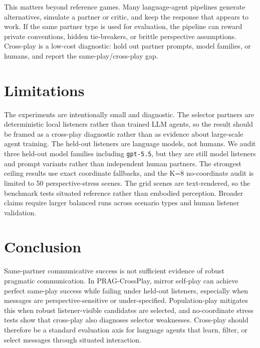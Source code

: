 \documentclass{article}
\begin{document}
This matters beyond reference games. Many language-agent pipelines generate alternatives, simulate a partner or critic, and keep the response that appears to work. If the same partner type is used for evaluation, the pipeline can reward private conventions, hidden tie-breakers, or brittle perspective assumptions. Cross-play is a low-cost diagnostic: hold out partner prompts, model families, or humans, and report the same-play/cross-play gap.

\section{Limitations}

The experiments are intentionally small and diagnostic. The selector partners are deterministic local listeners rather than trained LLM agents, so the result should be framed as a cross-play diagnostic rather than as evidence about large-scale agent training. The held-out listeners are language models, not humans. We audit three held-out model families including \texttt{gpt-5.5}, but they are still model listeners and prompt variants rather than independent human partners. The strongest ceiling results use exact coordinate fallbacks, and the K=8 no-coordinate audit is limited to 50 perspective-stress scenes. The grid scenes are text-rendered, so the benchmark tests situated reference rather than embodied perception. Broader claims require larger balanced runs across scenario types and human listener validation.

\section{Conclusion}

Same-partner communicative success is not sufficient evidence of robust pragmatic communication. In PRAG-CrossPlay, mirror self-play can achieve perfect same-play success while failing under held-out listeners, especially when messages are perspective-sensitive or under-specified. Population-play mitigates this when robust listener-visible candidates are selected, and no-coordinate stress tests show that cross-play also diagnoses selector weaknesses. Cross-play should therefore be a standard evaluation axis for language agents that learn, filter, or select messages through situated interaction.



\end{document}
